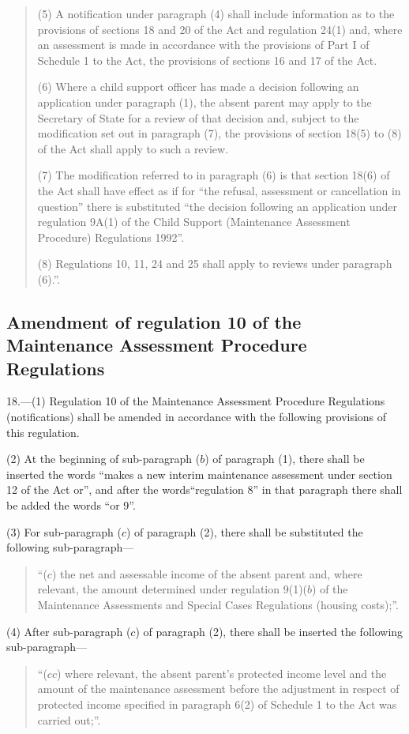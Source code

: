 \documentclass[12pt,a4paper]{article}
\begin{document}
\begin{quotation}
(5) A notification under paragraph (4) shall include information as to the provisions of sections 18 and 20 of the Act and regulation 24(1) and, where an assessment is made in accordance with the provisions of Part I of Schedule 1 to the Act, the provisions of sections 16 and 17 of the Act.

(6) Where a child support officer has made a decision following an application under paragraph (1), the absent parent may apply to the Secretary of State for a review of that decision and, subject to the modification set out in paragraph (7), the provisions of section 18(5) to (8) of the Act shall apply to such a review.

(7) The modification referred to in paragraph (6) is that section 18(6) of the Act shall have effect as if for “the refusal, assessment or cancellation in question” there is substituted “the decision following an application under regulation 9A(1) of the Child Support (Maintenance Assessment Procedure) Regulations 1992”.

(8) Regulations 10, 11, 24 and 25 shall apply to reviews under paragraph (6).”.
\end{quotation}

\subsection[18. Amendment of regulation 10 of the Maintenance Assessment Procedure Regulations]{Amendment of regulation 10 of the Maintenance Assessment Procedure Regulations}

18.—(1) Regulation 10 of the Maintenance Assessment Procedure Regulations (notifications) shall be amended in accordance with the following provisions of this regulation.

(2) At the beginning of sub-paragraph ($b$) of paragraph (1), there shall be inserted the words “makes a new interim maintenance assessment under section 12 of the Act or”, and after the words“regulation 8” in that paragraph there shall be added the words “or 9”.

(3) For sub-paragraph ($c$) of paragraph (2), there shall be substituted the following sub-paragraph—
\begin{quotation}
“($c$) the net and assessable income of the absent parent and, where relevant, the amount determined under regulation 9(1)($b$) of the Maintenance Assessments and Special Cases Regulations (housing costs);”.
\end{quotation}

(4) After sub-paragraph ($c$) of paragraph (2), there shall be inserted the following sub-paragraph—
\begin{quotation}
“($cc$) where relevant, the absent parent’s protected income level and the amount of the maintenance assessment before the adjustment in respect of protected income specified in paragraph 6(2) of Schedule 1 to the Act was carried out;”.
\end{quotation}
\end{document}
